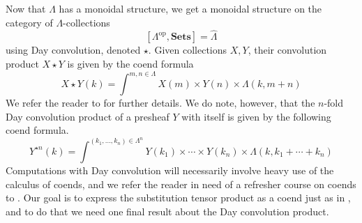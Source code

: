 \documentclass{amsbook} %
\newcommand{\mb}{\mathbf}
\numberwithin{section}{chapter}
\begin{document}
Now that $\mathbb{\Lambda}$ has a monoidal structure, we get a monoidal structure on the category of $\mathbb{\Lambda}$-collections
\[
[\mathbb{\Lambda}^{\textrm{op}}, \mb{Sets}] = \hat{\mathbb{\Lambda}}
\]
using Day convolution, denoted $\star$.  Given collections $X, Y$, their convolution product $X \star Y$ is given by the coend formula
\[
X \star Y (k) = \int^{m,n \in \mathbb{\Lambda}} X(m) \times Y(n) \times \mathbb{\Lambda}(k, m+n)
\]
We refer the reader to \cite{day-thesis} for further details.  We do note, however, that the $n$-fold Day convolution product of a presheaf $Y$ with itself is given by the following coend formula.
\[
Y^{\star n}(k) = \int^{(k_{1}, \ldots, k_{n}) \in \mathbb{\Lambda}^{n}} Y(k_{1}) \times \cdots \times Y(k_{n}) \times \mathbb{\Lambda}(k, k_{1} + \cdots + k_{n})
\]
Computations with Day convolution will necessarily involve heavy use of the calculus of coends, and we refer the reader in need of a refresher course on coends to \cite{maclane-catwork}.  Our goal is to express the substitution tensor product as a coend just as in \cite{kelly-op}, and to do that we need one final result about the Day convolution product.
\end{document}
